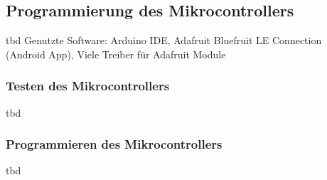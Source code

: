 \subsection{Programmierung des Mikrocontrollers}
\label{kapitel_programmierungMikrocontroller}
tbd
Genutzte Software: Arduino IDE, Adafruit Bluefruit LE Connection (Android App), Viele Treiber für Adafruit Module


\subsubsection*{Testen des Mikrocontrollers} 
tbd

\subsubsection*{Programmieren des Mikrocontrollers}
tbd